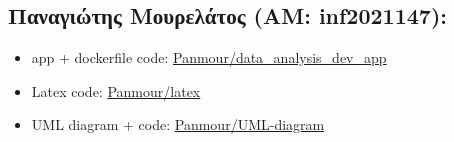 \documentclass[a4paper,12pt]{article}
\begin{document}
\subsection{Παναγιώτης Μουρελάτος (ΑΜ: inf2021147):}
\begin{itemize}
    \item app + dockerfile code: \href{https://github.com/Panmour/data_analysis_dev_app}{Panmour/data\_analysis\_dev\_app}
    \item Latex code:
    \href{https://github.com/Panmour/Anafora_latex}{Panmour/latex}
    \item UML diagram + code:
    \href{https://github.com/Panmour/UML-diagram}{Panmour/UML-diagram}
\end{itemize}
\end{document}
